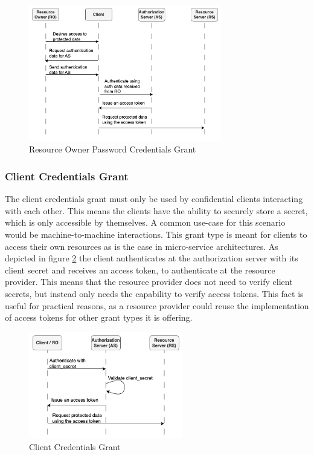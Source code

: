 \documentclass[
    fontsize=12pt,
    headings=small,
    parskip=half,           %
    bibliography=totoc,
    numbers=noenddot,       %
    open=any,               %
    ]{scrreprt}
\begin{document}
\begin{figure}[ht]
	\sffamily\footnotesize
	\includegraphics[width=0.75\textwidth]{pic/resource_owner_password_credentials_grant.png}
	\unitlength=0.75mm
	\linethickness{0.4pt}
	\caption{Resource Owner Password Credentials Grant}
	\label{fig:resource_owner_password_credentials_grant}
\end{figure}
	

\subsubsection{Client Credentials Grant}
The client credentials grant must only be used by confidential clients
interacting with each other. This means the clients have the ability to
securely store a secret, which is only accessible by themselves. A common
use-case for this scenario would be machine-to-machine interactions. This grant type is meant for clients to access their own resources as is the case in micro-service architectures. As depicted in figure \ref{fig:client_credentials_grant} the client authenticates at the authorization
server with its client secret and receives an access token, to authenticate at the resource provider. This means that the resource provider does not need to verify client secrets, but instead only needs the capability to verify access tokens. This fact is useful for practical reasons, as a resource provider could reuse the implementation of access tokens for other grant types it is offering.
\cite[Sec. 4.4.]{hardt2012rfc}

\begin{figure}[ht]
	\sffamily\footnotesize
	\includegraphics[width=0.6\textwidth]{pic/client_credentials_grant.png}
	\unitlength=0.75mm
	\linethickness{0.4pt}
	\caption{Client Credentials Grant}
	\label{fig:client_credentials_grant}
\end{figure}
\end{document}
